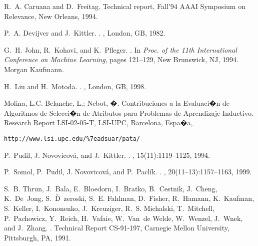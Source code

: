 \documentclass{article}
\begin{document}
\begin{thebibliography}{TBB}


R.~A. Caruana and D.~Freitag.
\newblock Technical report, {Fall'94 AAAI Symposium on Relevance}, {New
  Orleans}, 1994.


P.~A. Devijver and J.~Kittler.
.
, {London, GB}, 1982.


G.~H. John, R.~Kohavi, and K.~Pfleger.
.
\newblock In {\em {Proc. of the 11th International Conference on Machine
  Learning}}, pages 121--129, {New Brunswick, NJ}, 1994. {Morgan Kaufmann}.

H.~Liu and H.~Motoda.
.
, {London, GB}, 1998.

Molina, L.C. Belanche, L.; Nebot, �.  Contribuciones a la Evaluaci�n
de Algoritmos de Selecci�n de Atributos para Problemas de Aprendizaje
Inductivo.  Research Report LSI-02-05-T, LSI-UPC, Barcelona, Espa�a,

{\tt http://www.lsi.upc.edu/\%7eadsuar/pata/}

P.~Pudil, J. Novovicov\'a, and J.~Kittler.
.
, 15(11):1119--1125, 1994.

P.~Somol, P.~Pudil, J. Novovicov\'a, and P.~Pacl\'ik.
.
, 20(11--13):1157--1163, 1999.


S.~B. Thrun, J.~Bala, E.~Bloedorn, I.~Bratko, B.~Cestnik, J.~Cheng, K.~De~Jong,
  S.~D\v~zeroski, S.~E. Fahlman, D.~Fisher, R.~Hamann, K.~Kaufman, S.~Keller,
  I.~Kononenko, J.~Kreuziger, R.~S. Michalski, T.~Mitchell, P.~Pachowicz,
  Y.~Reich, H.~Vafaie, W.~Van~de Welde, W.~Wenzel, J.~Wnek, and J.~Zhang.
.
\newblock Technical Report CS-91-197, Carnegie Mellon University, Pittsburgh,
  PA, 1991.

\end{thebibliography}
\end{document}
